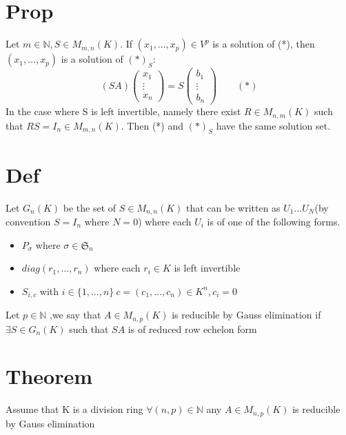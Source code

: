 \documentclass{book}
\begin{document}
\section{Prop} Let $m\in \mathbb{N}, S\in M_{m,n}(K)$. If $(x_1,...,x_p)\in V^p$ is a solution of (*), then $(x_1,...,x_p)$ is a solution of $(*)_S:$$$(SA) \left(\begin{aligned}
    x_1\\\vdots\\x_n
\end{aligned}\right)=S\left(\begin{aligned}
    b_1\\\vdots\\b_n
\end{aligned}\right)\qquad(*)
$$In the case where S is left invertible, namely there exist $R\in M_{n,m}(K)$ such that $RS=I_n\in M_{m,n}(K)$. Then (*) and $(*)_S$ have the same solution set.
\section{Def}
Let $G_n(K)$ be the set of $S\in M_{n,n}(K)$ that can be written as $U_1...U_N$(by convention $S=I_n$ where $N=0$)
where each $U_i$ is of one of the following forms.
\begin{itemize}
    \item $P_\sigma$ where $\sigma\in \mathfrak{S}_n$
    \item $diag(r_1,...,r_n)$ where each $r_i\in K$ is left invertible
    \item $S_{i,c}$ with $i\in \{1,...,n\}\ c=(c_1,...,c_n)\in K^n,c_i=0$
\end{itemize}
Let $p\in \mathbb{N}$ ,we say that $A\in M_{n,p}(K)$ is reducible by Gauss elimination if $\exists S\in G_n(K)$ such that $SA$ is of reduced row echelon form
\section{Theorem}
Assume that K is a division ring $\forall (n,p)\in \mathbb{N}$ any $A\in M_{n,p}(K)$ is reducible by Gauss elimination
\end{document}
